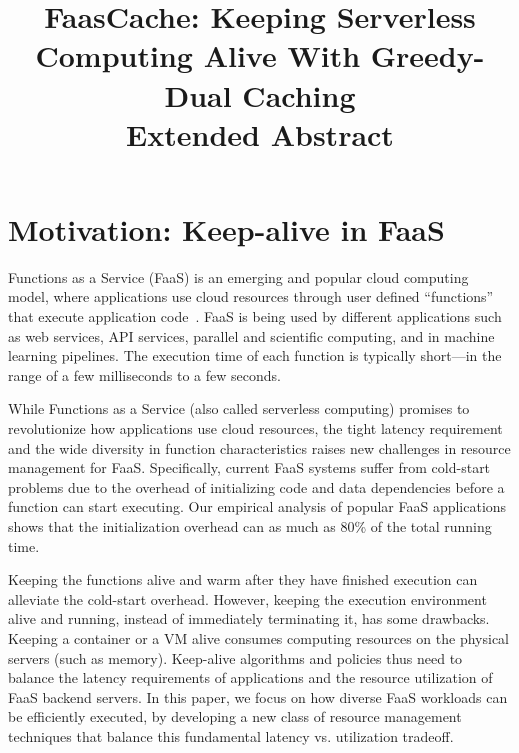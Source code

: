 \documentclass[pageno]{jpaper}
\begin{document}

\title{FaasCache: Keeping Serverless Computing Alive With Greedy-Dual Caching \\
Extended Abstract}

\date{}

\author{}

\maketitle 

\thispagestyle{empty}

\section{Motivation: Keep-alive in FaaS}
\vspace*{\subsecspace}
Functions as a Service (FaaS) is an emerging and popular cloud computing model, where applications use cloud resources through user defined ``functions'' that execute application code~\cite{jonas_cloud_2019}.
%
FaaS is being used by different applications such as web services, API services, parallel and scientific computing, and in machine learning pipelines. 
%
The execution time of each function is typically short---in the range of a few milliseconds to a few seconds. 


While Functions as a Service (also called serverless computing) promises to revolutionize how applications use cloud resources, the tight latency requirement and the wide diversity in function characteristics raises new challenges in resource management for FaaS. 
%
Specifically, current FaaS systems suffer from cold-start problems due to the overhead of initializing code and data dependencies before a function can start executing.
Our empirical analysis of popular FaaS applications shows that the initialization overhead can as much as 80\% of the total running time. 

Keeping the functions alive and warm after they have finished execution can alleviate the cold-start overhead.  
However, keeping the execution environment alive and running, instead of immediately terminating it, has some drawbacks. 
Keeping a container or a VM alive consumes computing resources on the physical servers (such as memory). 
Keep-alive algorithms and policies thus need to balance the latency requirements of applications and the resource utilization of FaaS backend servers.
%
In this paper, we focus on how diverse FaaS workloads can be efficiently executed, by developing a new class of resource management techniques that balance this fundamental latency vs. utilization tradeoff. 
\end{document}
